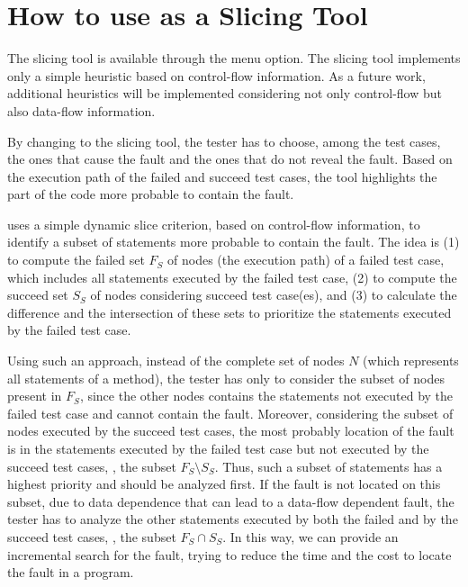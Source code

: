 \section{How to use \toolname as a Slicing Tool}\label{sec:slice}

The \toolname slicing tool is available through the  menu option. The slicing tool
implements only a simple heuristic based on control-flow
information. As a future work, additional heuristics will be
implemented considering not only control-flow but also data-flow
information.

By changing to the slicing tool, the tester has to choose, among
the test cases, the ones that cause the fault and the ones that do
not reveal the fault. Based on the execution path of the failed
and succeed test cases, the tool highlights the part of the code
more probable to contain the fault.

\toolname uses a simple dynamic slice criterion, based on
control-flow information, to identify a subset of statements more
probable to contain the fault. The idea is (1) to compute the
failed set $F_S$ of \BG nodes (the execution path) of a failed
test case, which includes all statements executed by the failed
test case, (2) to compute the succeed set $S_S$ of \BG nodes
considering succeed test case(es), and (3) to calculate the
difference and the intersection of these sets to prioritize the
statements executed by the failed test case.

Using such an approach, instead of the complete set of \BG nodes
$N$ (which represents all statements of a method), the tester has
only to consider the subset of \BG nodes present in $F_S$, since
the other \BG nodes contains the statements not executed by the
failed test case and cannot contain the fault. Moreover,
considering the subset of nodes executed by the succeed test
cases, the most probably location of the fault is in the
statements executed by the failed test case but not executed by
the succeed test cases, \ie, the subset $F_S \setminus S_S$. Thus,
such a subset of statements has a highest priority and should be
analyzed first. If the fault is not located on this subset, due to
data dependence that can lead to a data-flow dependent fault, the
tester has to analyze the other statements executed by both the
failed and by the succeed test cases, \ie, the subset $F_S \cap
S_S$. In this way, we can provide an incremental search for the
fault, trying to reduce the time and the cost to locate the fault
in a program.

